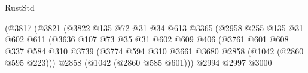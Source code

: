 \begin{lexlean}{RustStd}
\begin{coremodule}
                                              (@3817
                                                (@3821
                                                  (@3822
                                                    @135
                                                    @72
                                                    @31
                                                    @34
                                                    @613
                                                    @3365
                                                    (@2958
                                                      @255
                                                      @135
                                                      @31
                                                      @602
                                                      @611
                                                      (@3636
                                                        @107
                                                        @73
                                                        @35
                                                        @31
                                                        @602
                                                        @609
                                                        @406
                                                        (@3761
                                                          @601
                                                          @608
                                                          @337
                                                          @584
                                                          @310
                                                          @3739
                                                          (@3774
                                                            @594
                                                            @310
                                                            @3661
                                                            @3680
                                                            @2858
                                                            (@1042 (@2860 @595 @223)))
                                                          @2858
                                                          (@1042 (@2860 @585 @601)))
                                                        @2994
                                                        @2997
                                                        @3000

\end{coremodule}
\end{lexlean}
